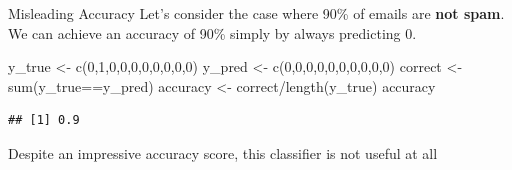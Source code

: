 \documentclass[
  10pt,
  ignorenonframetext,
  aspectratio=169]{beamer}
\newenvironment{Shaded}{\begin{snugshade}}{\end{snugshade}}
\newcommand{\DecValTok}[1]{\textcolor[rgb]{0.86,0.86,0.80}{#1}}
\newcommand{\FunctionTok}[1]{\textcolor[rgb]{0.94,0.94,0.56}{#1}}
\newcommand{\NormalTok}[1]{\textcolor[rgb]{0.80,0.80,0.80}{#1}}
\newcommand{\OtherTok}[1]{\textcolor[rgb]{0.94,0.94,0.56}{#1}}
\newcommand{\SpecialCharTok}[1]{\textcolor[rgb]{0.86,0.64,0.64}{#1}}
\begin{document}
\begin{frame}[fragile]{Misleading Accuracy}
\protect\hypertarget{misleading-accuracy}{}
Let's consider the case where 90\% of emails are \textbf{not spam}. We
can achieve an accuracy of 90\% simply by always predicting 0.

\begin{Shaded}
\begin{Highlighting}[]
\NormalTok{y\_true }\OtherTok{\textless{}{-}} \FunctionTok{c}\NormalTok{(}\DecValTok{0}\NormalTok{,}\DecValTok{1}\NormalTok{,}\DecValTok{0}\NormalTok{,}\DecValTok{0}\NormalTok{,}\DecValTok{0}\NormalTok{,}\DecValTok{0}\NormalTok{,}\DecValTok{0}\NormalTok{,}\DecValTok{0}\NormalTok{,}\DecValTok{0}\NormalTok{,}\DecValTok{0}\NormalTok{)}
\NormalTok{y\_pred }\OtherTok{\textless{}{-}} \FunctionTok{c}\NormalTok{(}\DecValTok{0}\NormalTok{,}\DecValTok{0}\NormalTok{,}\DecValTok{0}\NormalTok{,}\DecValTok{0}\NormalTok{,}\DecValTok{0}\NormalTok{,}\DecValTok{0}\NormalTok{,}\DecValTok{0}\NormalTok{,}\DecValTok{0}\NormalTok{,}\DecValTok{0}\NormalTok{,}\DecValTok{0}\NormalTok{)}
\NormalTok{correct }\OtherTok{\textless{}{-}} \FunctionTok{sum}\NormalTok{(y\_true}\SpecialCharTok{==}\NormalTok{y\_pred)}
\NormalTok{accuracy }\OtherTok{\textless{}{-}}\NormalTok{ correct}\SpecialCharTok{/}\FunctionTok{length}\NormalTok{(y\_true)}
\NormalTok{accuracy}
\end{Highlighting}
\end{Shaded}

\begin{verbatim}
## [1] 0.9
\end{verbatim}

Despite an impressive accuracy score, this classifier is not useful at
all
\end{frame}
\end{document}
